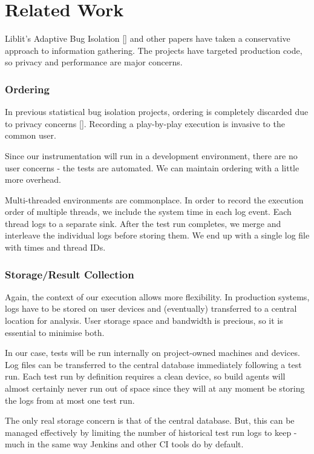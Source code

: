 \section{Related Work}
\label{sec:relwork}

Liblit’s Adaptive Bug Isolation [] and other papers have taken a conservative
approach to information gathering. The projects have targeted production code,
so privacy and performance are major concerns.


\subsubsection{Ordering}

In previous statistical bug isolation projects, ordering is completely discarded
due to privacy concerns []. Recording a play-by-play execution is invasive to
the common user.

Since our instrumentation will run in a development environment, there are no
user concerns - the tests are automated. We can maintain ordering with a little
more overhead.

Multi-threaded environments are commonplace. In order to record the execution
order of multiple threads, we include the system time in each log event. Each
thread logs to a separate sink. After the test run completes, we merge and
interleave the individual logs before storing them. We end up with a single log
file with times and thread IDs.

\subsubsection{Storage/Result Collection}

Again, the context of our execution allows more flexibility. In production
systems, logs have to be stored on user devices and (eventually) transferred to
a central location for analysis. User storage space and bandwidth is precious,
so it is essential to minimise both.

In our case, tests will be run internally on project-owned machines and devices.
Log files can be transferred to the central database immediately following a
test run. Each test run by definition requires a clean device, so build agents
will almost certainly never run out of space since they will at any moment be
storing the logs from at most one test run.

The only real storage concern is that of the central database. But, this can be
managed effectively by limiting the number of historical test run logs to keep -
much in the same way Jenkins and other CI tools do by default.


